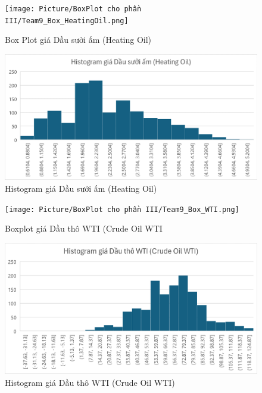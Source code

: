 \documentclass[conference]{IEEEtran}
\begin{document}
\begin{figure}[H]
    \centering
    \begin{minipage}{0.23\textwidth}
    \centering
    \texttt{[image: Picture/BoxPlot cho phần III/Team9\_Box\_HeatingOil.png]}
    \caption{Box Plot giá Dầu sưởi ấm (Heating Oil)}
    \label{fig:1}
    \end{minipage}
    \hfill
    \begin{minipage}{0.23\textwidth}
    \centering
    \includegraphics[width=1\textwidth]{Picture/Histogram cho ở phần III/Team9_His_HeatingOil.png}
    \caption{Histogram giá Dầu sưởi ấm (Heating Oil)}
    \label{fig:2}
    \end{minipage}
\end{figure}

\begin{figure}[H]
    \centering
    \begin{minipage}{0.23\textwidth}
    \centering
    \texttt{[image: Picture/BoxPlot cho phần III/Team9\_Box\_WTI.png]}
    \caption{Boxplot giá Dầu thô WTI (Crude Oil WTI}
    \label{fig:1}
    \end{minipage}
    \hfill
    \begin{minipage}{0.23\textwidth}
    \centering
    \includegraphics[width=1\textwidth]{Picture/Histogram cho ở phần III/Team9_His_WTI.png}
    \caption{Histogram giá Dầu thô WTI (Crude Oil WTI)}
    \label{fig:2}
    \end{minipage}
\end{figure}
\end{document}
